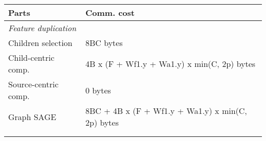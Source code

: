 \documentclass[10pt,oneside]{memoir}
\begin{document}
\begin{longtable}[]{@{}ll@{}}
\toprule
\begin{minipage}[b]{0.57\columnwidth}\raggedright
Parts\strut
\end{minipage} & \begin{minipage}[b]{0.37\columnwidth}\raggedright
Comm. cost\strut
\end{minipage}\tabularnewline
\midrule
\endhead
\begin{minipage}[t]{0.57\columnwidth}\raggedright
\emph{Feature duplication}\strut
\end{minipage} & \begin{minipage}[t]{0.37\columnwidth}\raggedright
\strut
\end{minipage}\tabularnewline
\begin{minipage}[t]{0.57\columnwidth}\raggedright
Children selection\strut
\end{minipage} & \begin{minipage}[t]{0.37\columnwidth}\raggedright
8BC bytes\strut
\end{minipage}\tabularnewline
\begin{minipage}[t]{0.57\columnwidth}\raggedright
Child-centric comp.\strut
\end{minipage} & \begin{minipage}[t]{0.37\columnwidth}\raggedright
4B x (F + Wf1.y + Wa1.y) x min(C, 2p) bytes\strut
\end{minipage}\tabularnewline
\begin{minipage}[t]{0.57\columnwidth}\raggedright
Source-centric comp.\strut
\end{minipage} & \begin{minipage}[t]{0.37\columnwidth}\raggedright
0 bytes\strut
\end{minipage}\tabularnewline
\begin{minipage}[t]{0.57\columnwidth}\raggedright
Graph SAGE\strut
\end{minipage} & \begin{minipage}[t]{0.37\columnwidth}\raggedright
8BC + 4B x (F + Wf1.y + Wa1.y) x min(C, 2p) bytes\strut
\end{minipage}\tabularnewline
\begin{minipage}[t]{0.57\columnwidth}\raggedright
\strut
\end{minipage} & \begin{minipage}[t]{0.37\columnwidth}\raggedright
\strut
\end{minipage}\tabularnewline
\begin{minipage}[t]{0.57\columnwidth}\raggedright

\end{minipage}
\end{longtable}
\end{document}
